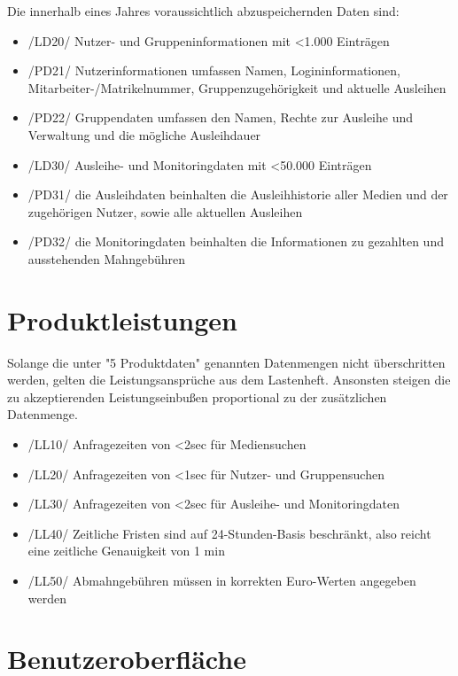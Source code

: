 \documentclass[12pt, a4paper]{article}
\begin{document}
Die innerhalb eines Jahres voraussichtlich abzuspeichernden Daten sind:
\begin{itemize}
	\item /LD20/ Nutzer- und Gruppeninformationen mit <1.000 Einträgen
	\item /PD21/ Nutzerinformationen umfassen Namen, Logininformationen, Mitarbeiter-/Matrikelnummer, Gruppenzugehörigkeit und aktuelle Ausleihen
	\item /PD22/ Gruppendaten umfassen den Namen, Rechte zur Ausleihe und Verwaltung und die mögliche Ausleihdauer
	\item /LD30/ Ausleihe- und Monitoringdaten mit <50.000 Einträgen
	\item /PD31/ die Ausleihdaten beinhalten die Ausleihhistorie aller Medien und der zugehörigen Nutzer, sowie alle aktuellen Ausleihen
	\item /PD32/ die Monitoringdaten beinhalten die Informationen zu gezahlten und ausstehenden Mahngebühren
\end{itemize}
\pagebreak

\section{Produktleistungen}
Solange die unter "5 Produktdaten" genannten Datenmengen nicht überschritten werden, gelten die Leistungsansprüche aus dem Lastenheft. Ansonsten steigen die zu akzeptierenden Leistungseinbußen proportional zu der zusätzlichen Datenmenge.
\begin{itemize}
	\item /LL10/ Anfragezeiten von <2sec für Mediensuchen
	\item /LL20/ Anfragezeiten von <1sec für Nutzer- und Gruppensuchen
	\item /LL30/ Anfragezeiten von <2sec für Ausleihe- und Monitoringdaten
	\item /LL40/ Zeitliche Fristen sind auf 24-Stunden-Basis beschränkt, also reicht eine zeitliche Genauigkeit von 1 min
	\item /LL50/ Abmahngebühren müssen in korrekten Euro-Werten angegeben werden
\end{itemize}
\pagebreak

\section{Benutzeroberfläche}
\pagebreak
\end{document}

